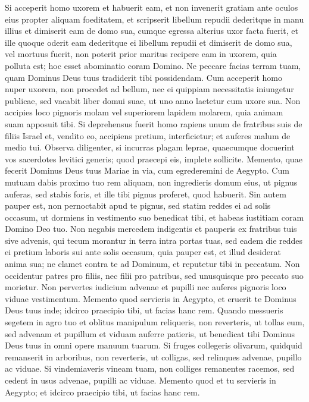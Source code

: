 \begin{biblechapter} 
\verse Si acceperit homo uxorem et habuerit eam, et non invenerit gratiam ante oculos eius propter aliquam foeditatem, et scripserit libellum repudii dederitque in manu illius et dimiserit eam de domo sua, 
\verse cumque egressa alterius uxor facta fuerit,  
\verse et ille quoque oderit eam dederitque ei libellum repudii et dimiserit de domo sua, vel mortuus fuerit, 
\verse non poterit prior maritus recipere eam in uxorem, quia polluta est; hoc esset abominatio coram Domino. Ne peccare facias terram tuam, quam Dominus Deus tuus tradiderit tibi possidendam. 
\verse Cum acceperit homo nuper uxorem, non procedet ad bellum, nec ei quippiam necessitatis iniungetur publicae, sed vacabit liber domui suae, ut uno anno laetetur cum uxore sua. 
\verse Non accipies loco pignoris molam vel superiorem lapidem molarem, quia animam suam apposuit tibi. 
\verse Si deprehensus fuerit homo rapiens unum de fratribus suis de filiis Israel et, vendito eo, accipiens pretium, interficietur; et auferes malum de medio tui. 
\verse Observa diligenter, si incurras plagam leprae, quaecumque docuerint vos sacerdotes levitici generis; quod praecepi eis, implete sollicite. 
\verse Memento, quae fecerit Dominus Deus tuus Mariae in via, cum egrederemini de Aegypto. 
\verse Cum mutuam dabis proximo tuo rem aliquam, non ingredieris domum eius, ut pignus auferas, 
\verse sed stabis foris, et ille tibi pignus proferet, quod habuerit. 
\verse Sin autem pauper est, non pernoctabit apud te pignus, 
\verse sed statim reddes ei ad solis occasum, ut dormiens in vestimento suo benedicat tibi, et habeas iustitiam coram Domino Deo tuo. 
\verse Non negabis mercedem indigentis et pauperis ex fratribus tuis sive advenis, qui tecum morantur in terra intra portas tuas, 
\verse sed eadem die reddes ei pretium laboris sui ante solis occasum, quia pauper est, et illud desiderat anima sua; ne clamet contra te ad Dominum, et reputetur tibi in peccatum. 
\verse Non occidentur patres pro filiis, nec filii pro patribus, sed unusquisque pro peccato suo morietur. 
\verse Non pervertes iudicium advenae et pupilli nec auferes pignoris loco viduae vestimentum. 
\verse Memento quod servieris in Aegypto, et eruerit te Dominus Deus tuus inde; idcirco praecipio tibi, ut facias hanc rem. 
\verse Quando messueris segetem in agro tuo et oblitus manipulum reliqueris, non reverteris, ut tollas eum, sed advenam et pupillum et viduam auferre patieris, ut benedicat tibi Dominus Deus tuus in omni opere manuum tuarum. 
\verse Si fruges collegeris olivarum, quidquid remanserit in arboribus, non reverteris, ut colligas, sed relinques advenae, pupillo ac viduae. 
\verse Si vindemiaveris vineam tuam, non colliges remanentes racemos, sed cedent in usus advenae, pupilli ac viduae.  
\verse Memento quod et tu servieris in Aegypto; et idcirco praecipio tibi, ut facias hanc rem. 
\end{biblechapter}

